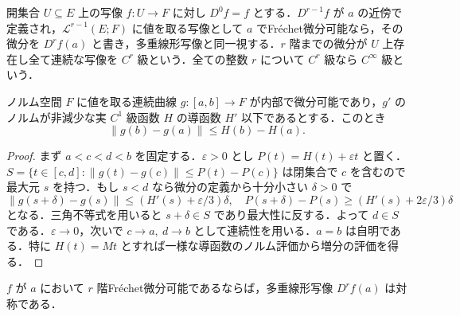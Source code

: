 \begin{defn}[高階Fréchet微分]
開集合 $U\subseteq E$ 上の写像 $f:U\to F$ に対し $D^0f=f$ とする．$D^{r-1}f$ が $a$ の近傍で定義され，$\mathcal L^{r-1}(E;F)$ に値を取る写像として $a$ でFréchet微分可能なら，その微分を $D^rf(a)$ と書き，多重線形写像と同一視する．$r$ 階までの微分が $U$ 上存在し全て連続な写像を $C^r$ 級という．全ての整数 $r$ について $C^r$ 級なら $C^\infty$ 級という．
\end{defn}
\begin{prop}[ノルム値曲線の微分評価]
ノルム空間 $F$ に値を取る連続曲線 $g:[a,b]\to F$ が内部で微分可能であり，$g'$ のノルムが非減少な実 $C^1$ 級函数 $H$ の導函数 $H'$ 以下であるとする．このとき
\[
\|g(b)-g(a)\|\leq H(b)-H(a).
\]

\end{prop}
\begin{proof}
まず $a<c<d<b$ を固定する．$\varepsilon>0$ とし $P(t)=H(t)+\varepsilon t$ と置く．$S=\{t\in[c,d]:\|g(t)-g(c)\|\leq P(t)-P(c)\}$ は閉集合で $c$ を含むので最大元 $s$ を持つ．もし $s<d$ なら微分の定義から十分小さい $\delta>0$ で
\[
\|g(s+\delta)-g(s)\|\leq(H'(s)+\varepsilon/3)\delta,\quad
P(s+\delta)-P(s)\geq(H'(s)+2\varepsilon/3)\delta
\]
となる．三角不等式を用いると $s+\delta\in S$ であり最大性に反する．よって $d\in S$ である．$\varepsilon\to0$，次いで $c\to a,\ d\to b$ として連続性を用いる．$a=b$ は自明である．特に $H(t)=Mt$ とすれば一様な導函数のノルム評価から増分の評価を得る．
\end{proof}
\begin{prop}[高階微分の対称性]
$f$ が $a$ において $r$ 階Fréchet微分可能であるならば，多重線形写像 $D^rf(a)$ は対称である．
\end{prop}
